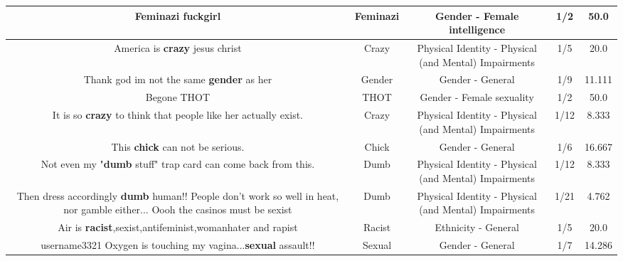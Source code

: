 \documentclass[11pt]{article}
\newlength\mylength
\begin{document}
\begin{center}
\begin{longtable}{|C{.65\mylength}|C{.30\mylength}|C{.12\mylength}|C{.12\mylength}|C{.12\mylength}|}
  \small Feminazi fuckgirl\normalsize   & Feminazi & Gender - Female intelligence & 1/2 & 50.0 \\  \hline
  \small America is \textbf{crazy} jesus christ\normalsize   & Crazy & Physical Identity - Physical (and Mental) Impairments & 1/5 & 20.0 \\  \hline
  \small Thank god im not the same \textbf{gender} as her\normalsize   & Gender & Gender - General & 1/9 & 11.111 \\  \hline
  \small Begone THOT\normalsize   & THOT & Gender - Female sexuality & 1/2 & 50.0 \\  \hline
  \small It is so \textbf{crazy} to think that people like her actually exist.\normalsize   & Crazy & Physical Identity - Physical (and Mental) Impairments & 1/12 & 8.333 \\  \hline
  \small This \textbf{chick} can not be serious.\normalsize   & Chick & Gender - General & 1/6 & 16.667 \\  \hline
  \small Not even my "\textbf{dumb} stuff" trap card can come back from this.\normalsize   & Dumb & Physical Identity - Physical (and Mental) Impairments & 1/12 & 8.333 \\  \hline
  \small Then dress accordingly \textbf{dumb} human!! People don't work so well in heat,  nor gamble either...  Oooh the casinos must be sexist\normalsize   & Dumb & Physical Identity - Physical (and Mental) Impairments & 1/21 & 4.762 \\  \hline
  \small Air is \textbf{racist},sexist,antifeminist,womanhater and rapist\normalsize   & Racist & Ethnicity - General & 1/5 & 20.0 \\  \hline
  \small username3321 Oxygen is touching my vagina...\textbf{sexual} assault!!\normalsize   & Sexual & Gender - General & 1/7 & 14.286 \\  \hline

\end{longtable}
\end{center}
\end{document}
